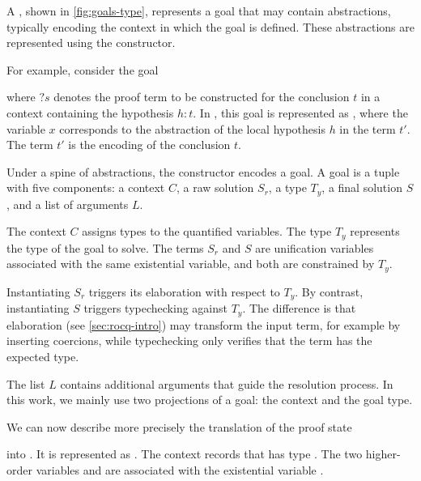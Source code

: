 A , shown in \cref{fig:goals-type}, represents a goal that may
contain abstractions, typically encoding the context in which the goal is
defined. These abstractions are represented using the  constructor.

For example, consider the \rocq{} goal
\begin{prooftree}
\end{prooftree}
where $?s$ denotes the proof term to be constructed for the conclusion
$t$ in a context containing the hypothesis $h : t$. In \elpi{}, this
goal is represented as , where the variable $x$
corresponds to the abstraction of the local hypothesis $h$ in the term
$t'$. The term $t'$ is the \elpi{} encoding of the \rocq{} conclusion
$t$.

Under a spine of  abstractions, the  constructor
encodes a goal. A goal is a tuple with five components: a context $C$,
a raw solution $S_r$, a type $T_y$, a final solution $S$, and a list of
arguments $L$.

The context $C$ assigns types to the quantified variables. The type
$T_y$ represents the type of the \rocq goal to solve. The terms $S_r$
and $S$ are \elpi unification variables associated with the same
\rocq existential variable, and both are constrained by $T_y$.

Instantiating $S_r$ triggers its elaboration with respect to $T_y$.
By contrast, instantiating $S$ triggers typechecking against $T_y$.
The difference is that elaboration (see \cref{sec:rocq-intro}) may
transform the input term, for example by inserting coercions, while
typechecking only verifies that the term has the expected type.

The list $L$ contains additional arguments that guide the resolution
process. In this work, we mainly use two projections of a goal: the
context and the goal type.

We can now describe more precisely the translation of the proof state

\begin{prooftree}
\end{prooftree}

into \elpi. It is represented as
. The context
\eI{[decl x ~«t»~]} records that  has type . The two
higher-order variables  and  are associated with the
\rocq existential variable .

